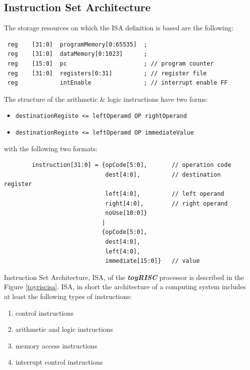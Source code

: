 \subsection{Instruction Set Architecture}

The storage resources on which the ISA definition is based are the following:
\begin{verbatim}
 reg    [31:0]  programMemory[0:65535]  ;
 reg    [31:0]  dataMemory[0:1023]      ;
 reg    [15:0]  pc                      ; // program counter
 reg    [31:0]  registers[0:31]         ; // register file
 reg            intEnable               ; // interrupt enable FF
 \end{verbatim}

 The structure of the arithmetic \& logic instructions have two forms:
 \begin{itemize}
    \item {\tt destinationRegiste <= leftOperamd OP rightOperand}
    \item {\tt destinationRegiste <= leftOperamd OP immediateValue}
 \end{itemize}
\hspace{-5mm}with the  following two formats:
\begin{verbatim}
        instruction[31:0] = {opCode[5:0],       // operation code
                             dest[4:0],         // destination register
                             left[4:0],         // left operand
                             right[4:0],        // right operand
                             noUse[10:0]}
                            |
                            {opCode[5:0],
                             dest[4:0],
                             left[4:0],
                             immediate[15:0]}   // value
\end{verbatim}

Instruction Set Architecture, ISA, of the {\bf {\em toyRISC}} processor is described in
the Figure \ref{toyriscisa}. ISA, in short the architecture of a computing system includes at least the following types of instructions:
\begin{enumerate}
    \item control instructions
    \item arithmetic and logic instructions
    \item memory access instructions
    \item interrupt control instructions
\end{enumerate}


